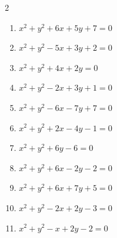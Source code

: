 \begin{multicols}{2}
\begin{enumerate}
  \item $x^{2}+y^{2}+6x+5y+7=0$


  \item $x^{2}+y^{2}-5x+3y+2=0$


  \item $x^{2}+y^{2}+4x+2y=0$


  \item $x^{2}+y^{2}-2x+3y+1=0$


\columnbreak %

  \item $x^{2}+y^{2}-6x-7y+7=0$


  \item $x^{2}+y^{2}+2x-4y-1=0$


  \item $x^{2}+y^{2}+6y-6=0$


  \item $x^{2}+y^{2}+6x-2y-2=0$


  \item $x^{2}+y^{2}+6x+7y+5=0$


  \item $x^{2}+y^{2}-2x+2y-3=0$


  \item $x^{2}+y^{2}-x+2y-2=0$


\end{enumerate}
\end{multicols}
